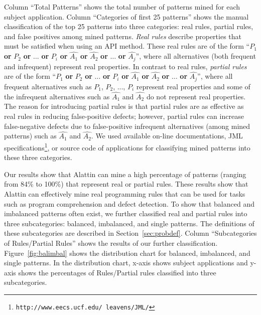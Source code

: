 Column ``Total Patterns'' shows the total number of patterns mined for each subject application. Column ``Categories of first 25 patterns'' shows the manual classification of the top 25 patterns into three categories: real rules, partial rules, and false positives among mined patterns. \emph{Real rules} describe properties that must be satisfied when using an API method. These real rules are of the form ``$P_1$ \textbf{or} $P_2$ \textbf{or} $\ldots$ \textbf{or} $P_i$ \textbf{or} $\hat{A_1}$ \textbf{or} $\hat{A_2}$ \textbf{or} $\ldots$ \textbf{or} $\hat{A_j}$'', where all alternatives (both frequent and infrequent) represent real properties. In contrast to real rules, \emph{partial rules} are of the form ``$P_1$ \textbf{or} $P_2$ \textbf{or} $\ldots$ \textbf{or} $P_i$ \textbf{or} $\hat{A_1}$ \textbf{or} $\hat{A_2}$ \textbf{or} $\ldots$ \textbf{or} $\hat{A_j}$'', where all frequent alternatives such as $P_1$, $P_2$, ..., $P_i$ represent real properties and some of the infrequent alternatives such as $\hat{A_1}$ and $\hat{A_2}$ do not represent real properties. The reason for introducing partial rules is that partial rules are as effective as real rules in reducing false-positive defects; however, partial rules can increase false-negative defects due to false-positive infrequent alternatives (among mined patterns) such as $\hat{A_1}$ and $\hat{A_2}$. We used available on-line documentations, JML specifications\footnote{\texttt{http://www.eecs.ucf.edu/~leavens/JML/}}, or source code of applications for classifying mined patterns into these three categories. 

Our results show that Alattin can mine a high percentage of patterns (ranging from 84\% to 100\%) that represent real or partial rules. These results show that Alattin can effectively mine real programming rules that can be used for tasks such as program comprehension and defect detection. To show that balanced and imbalanced patterns often exist, we further classified real and partial rules into three subcategories: balanced, imbalanced, and single patterns. The definitions of these subcategories are described in Section~\ref{sec:probdef}. Column ``Subcategories of Rules/Partial Rules'' shows the results of our further classification. Figure~\ref{fig:balimbal} shows the distribution chart for balanced, imbalanced, and single patterns. In the distribution chart, x-axis shows subject applications and y-axis shows the percentages of Rules/Partial rules classified into three subcategories. 

